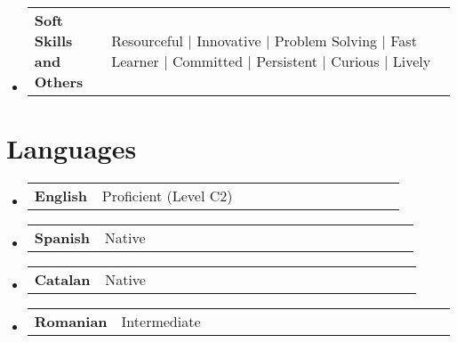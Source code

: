 \documentclass[a4paper,10pt]{article}
\makeatletter
\newcommand{\resumeSectionTypeOne}[2]{
  \item\begin{tabular*}{0.99\textwidth}[t]{
    p{0.18\linewidth}p{0.81\linewidth}
  }
  \textbf{#1} & #2
  \end{tabular*}\vspace{-2pt}
}
\newcommand{\resumeTrioHeading}[3]{
  \item
    \begin{tabular*}{0.96\textwidth}[t]{
      l@{\extracolsep{\fill}}c@{\extracolsep{\fill}}r
    }
      \textbf{#1} & \small \textit{#2} & \small #3
    \end{tabular*}
}
\newcommand{\resumeHeadingListStart}{
  \begin{itemize}[leftmargin=0.15in, label={}]
}
\newcommand{\resumeHeadingListEnd}{\end{itemize}}
\makeatother
\begin{document}
  \resumeHeadingListStart{}
    \resumeSectionTypeOne{Soft Skills and Others}{Resourceful \; $|$ \; Innovative \; $|$ \; Problem Solving \; $|$ \; Fast Learner \; $|$ \; Committed \; $|$ \; Persistent \; $|$ \; Curious \; $|$ \; Lively }
  \resumeHeadingListEnd{}

\section{Languages}
  \resumeHeadingListStart{}
    \resumeSectionTypeOne{English}{Proficient (Level C2)}
    \resumeSectionTypeOne{Spanish}{Native}
    \resumeSectionTypeOne{Catalan}{Native}
    \resumeSectionTypeOne{Romanian}{Intermediate}
  \resumeHeadingListEnd{}



  
\end{document}

